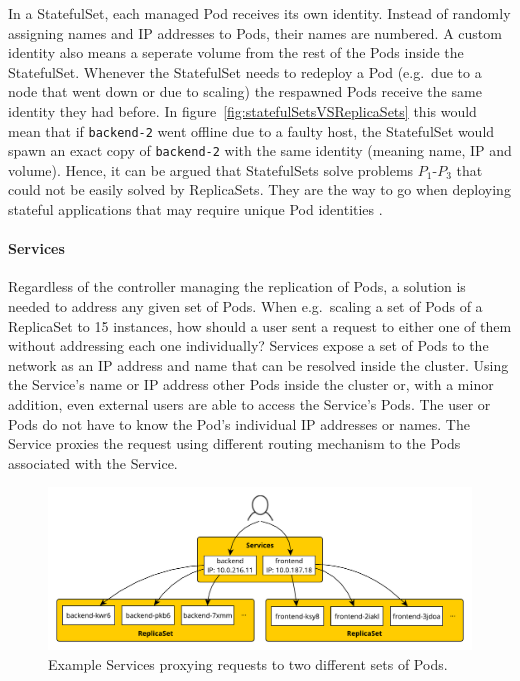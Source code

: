 In a StatefulSet, each managed Pod receives its own identity. Instead of
randomly assigning names and \ac{IP} addresses to Pods, their names are
numbered. A custom identity also means a seperate volume from the rest of the
Pods inside the StatefulSet. Whenever the StatefulSet needs to redeploy a Pod
(e.g.\ due to a node that went down or due to scaling) the respawned Pods
receive the same identity they had before. In
figure~\ref{fig:statefulSetsVSReplicaSets} this would mean that if
\texttt{backend-2} went offline due to a faulty host, the StatefulSet would
spawn an exact copy of \texttt{backend-2} with the same identity (meaning name,
\ac{IP} and volume). Hence, it can be argued that StatefulSets solve problems
$P_1$-$P_3$ that could not be easily solved by ReplicaSets. They are the way to
go when deploying stateful applications that may require unique Pod identities
\autocite[Ch. 10]{LuksaKubernetesAction2017}.

\paragraph{Services}%
\label{par:Services}
Regardless of the controller managing the replication of Pods, a solution is
needed to address any given set of Pods. When e.g.\ scaling a set of Pods of a
ReplicaSet to 15 instances, how should a user sent a request to either one of
them without addressing each one individually? Services expose a set of Pods to
the network as an \ac{IP} address and name that can be resolved inside the
cluster. Using the Service's name or \ac{IP} address other Pods inside the
cluster or, with a minor addition, even external users are able to access the
Service's Pods. The user or Pods do not have to know the Pod's individual
\ac{IP} addresses or names. The Service proxies the request using different
routing mechanism \autocite{AuthorsService2019} to the Pods associated with the
Service.

\begin{figure}[H]
\begin{center}
  \includegraphics[scale=0.55]{images/figures/service_example.pdf}
\end{center}
\caption{Example Services proxying requests to two different sets of Pods.}%
\label{fig:services_example}
\end{figure}

